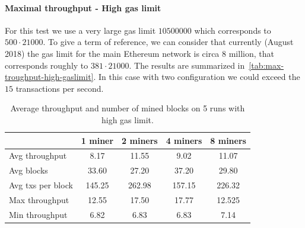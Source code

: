 \paragraph{Maximal throughput - High gas limit}
\label{sec:max-throughput-high-gaslimit}
For this test we use a very large gas limit $10500000$ which corresponds to $500
\cdot 21000$. To give a term of reference, we can consider that currently
(August 2018) the gas limit for the main Ethereum network is circa $8$ million,
that corresponds roughly to $381 \cdot 21000$. The results are summarized
in~\autoref{tab:max-troughput-high-gaslimit}. In this case with two
configuration we could exceed the $15$ transactions per second.

\begin{table}[h!]
  \centering
  \begin{tabular}{l | cccc}
    & 1 miner & 2 miners & 4 miners & 8 miners \\ \hline
    Avg throughput & 8.17 & 11.55 & 9.02 & 11.07 \\
    Avg blocks & 33.60 & 27.20 & 37.20 & 29.80 \\
    Avg txs per block & 145.25 & 262.98 & 157.15 & 226.32  \\
    Max throughput & 12.55 & 17.50 & 17.77 & 12.525 \\
    Min throughput & 6.82 & 6.83 & 6.83 & 7.14 \\
  \end{tabular}
  \caption{Average throughput and number of mined blocks on 5 runs with high gas limit.}
  \label{tab:max-troughput-high-gaslimit}
\end{table}
